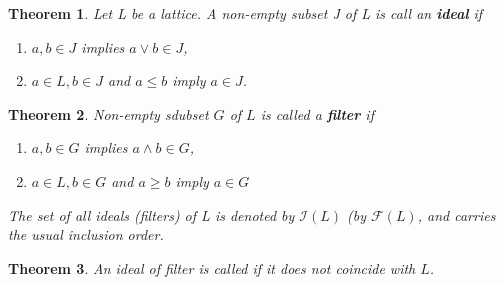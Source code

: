 \documentclass[a4paper,12pt,oneside]{report}%
\newtheorem{theorem}{Theorem}
\begin{document}
\begin{theorem}
Let L be a lattice. A non-empty subset J of L is call an \textbf{ideal} if
    \begin{enumerate}[label=(\roman*)]
        \item $a,b \in J$ implies $a \vee b \in J$,
        \item $a \in L, b \in J$ and $a \leq b$ imply $a \in J$.
    \end{enumerate}
\end{theorem}

\begin{theorem}
Non-empty sdubset $G$ of $L$ is called a \textbf{filter} if
    \begin{enumerate}[label=(\roman*)]
        \item $a,b \in G$ implies $a \wedge b \in G$,
        \item $a \in L, b \in G$ and $a \geq b$ imply $a \in G$
    \end{enumerate}
The set of all ideals (filters) of L is denoted by $\mathcal{I}(L)$ (by 
    $\mathcal{F}(L)$, and carries the usual inclusion order.
\end{theorem}

\begin{theorem}
An ideal of filter is called  if it does not coincide with $L$.
\end{theorem}
\end{document}
